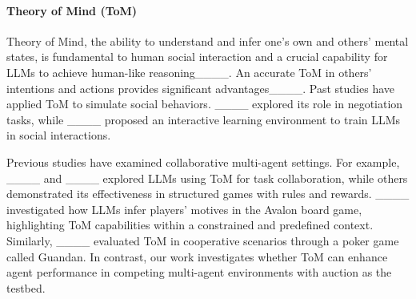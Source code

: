 \vspace{-0.05in}
\paragraph{Theory of Mind (ToM)}\;\;
Theory of Mind, the ability to understand and infer one's own and others' mental states, is fundamental to human social interaction and a crucial capability for LLMs to achieve human-like reasoning____. An accurate ToM in others' intentions and actions provides significant advantages____. Past studies have applied ToM to simulate social behaviors. ____ explored its role in negotiation tasks, while ____ proposed an interactive learning environment to train LLMs in social interactions. 

Previous studies have examined collaborative multi-agent settings. For example, ____ and ____ explored LLMs using ToM for task collaboration, while others demonstrated its effectiveness in structured games with rules and rewards. ____ investigated how LLMs infer players' motives in the Avalon board game, highlighting ToM capabilities within a constrained and predefined context. Similarly, ____ evaluated ToM in cooperative scenarios through a poker game called Guandan. In contrast, our work investigates whether ToM can enhance agent performance in competing multi-agent environments with auction as the testbed.